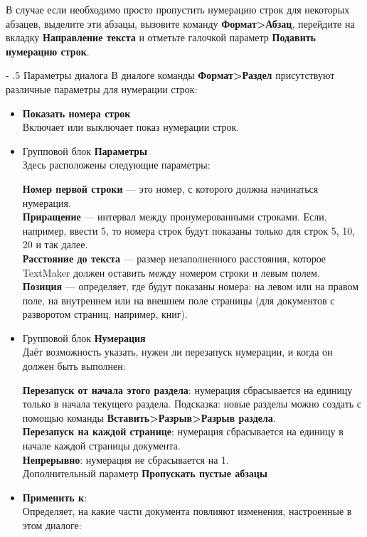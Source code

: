 \documentclass[a4paper,10pt]{article}
\makeatletter
\renewcommand\paragraph{%
   \@startsection{paragraph}{4}{0mm}%
      {-\baselineskip}%
      {.5\baselineskip}%
      {\normalfont\normalsize\bfseries}}
\makeatother
\begin{document}
В случае если необходимо просто пропустить нумерацию строк для некоторых абзацев, выделите эти абзацы, вызовите команду \textbf{Формат>Абзац}, перейдите на вкладку \textbf{Направление текста} и отметьте галочкой параметр \textbf{Подавить нумерацию строк}.

\paragraph{Параметры диалога}
В диалоге команды \textbf{Формат>Раздел} присутствуют различные параметры для нумерации строк:
\begin{itemize}
 \item \textbf{Показать номера строк}\\
 Включает или выключает показ нумерации строк.
 \item Групповой блок \textbf{Параметры}\\
 Здесь расположены следующие параметры:
 
 \textbf{Номер первой строки} --- это номер, с которого должна начинаться нумерация.\\
 \textbf{Приращение} --- интервал между пронумерованными строками. Если, например, ввести 5, то номера строк будут показаны только для строк 5, 10, 20 и так далее.\\
 \textbf{Расстояние до текста} --- размер незаполненного расстояния, которое TextMaker должен оставить между номером строки и левым полем.\\
 \textbf{Позиция} --- определяет, где будут показаны номера: на левом или на правом поле, на внутреннем или на внешнем поле страницы (для документов с разворотом страниц, например, книг).
 \item Групповой блок \textbf{Нумерация}\\
 Даёт возможность указать, нужен ли перезапуск нумерации, и когда он должен быть выполнен:
 
 \textbf{Перезапуск от начала этого раздела}: нумерация сбрасывается на единицу только в начала текущего раздела. Подсказка: новые разделы можно создать с помощью команды \textbf{Вставить>Разрыв>Разрыв раздела}.\\
 \textbf{Перезапуск на каждой странице}: нумерация сбрасывается на единицу в начале каждой страницы документа.\\
 \textbf{Непрерывно}: нумерация не сбрасывается на 1.\\
 Дополнительный параметр \textbf{Пропускать пустые абзацы}
 \item \textbf{Применить к}:\\
 Определяет, на какие части документа повлияют изменения, настроенные в этом диалоге:
 

\end{itemize}
\end{document}
